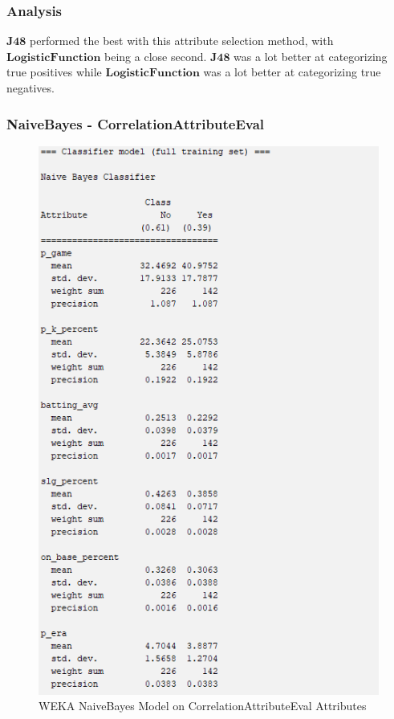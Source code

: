 \documentclass[12pt]{article}
\begin{document}
\newpage
\subsubsection{Analysis}
$\textbf{J48}$ performed the best with this attribute selection method, with $\textbf{LogisticFunction}$ being a close second. $\textbf{J48}$ was a lot better at categorizing true positives while $\textbf{LogisticFunction}$ was a lot better at categorizing true negatives. 

\newpage
\subsubsection{NaiveBayes - CorrelationAttributeEval}
\begin{figure}[h!]
    \includegraphics[scale=0.4]{./images/CorrelationAttributeEval/NaiveBayes-Model.png}
\centering
    \caption{WEKA NaiveBayes Model on CorrelationAttributeEval Attributes}
\end{figure}
\end{document}
